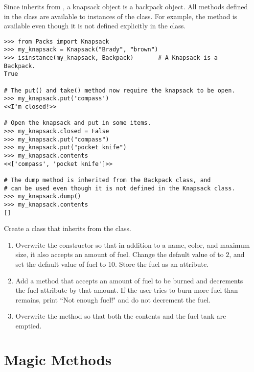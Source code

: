 Since  inherits from , a knapsack object is a backpack object.
All methods defined in the  class are available to instances of the  class.
For example, the  method is available even though it is not defined explicitly in the  class.

\begin{lstlisting}
>>> from Packs import Knapsack
>>> my_knapsack = Knapsack("Brady", "brown")
>>> isinstance(my_knapsack, Backpack)       # A Knapsack is a Backpack.
True

# The put() and take() method now require the knapsack to be open.
>>> my_knapsack.put('compass')
<<I'm closed!>>

# Open the knapsack and put in some items.
>>> my_knapsack.closed = False
>>> my_knapsack.put("compass")
>>> my_knapsack.put("pocket knife")
>>> my_knapsack.contents
<<['compass', 'pocket knife']>>

# The dump method is inherited from the Backpack class, and
# can be used even though it is not defined in the Knapsack class.
>>> my_knapsack.dump()
>>> my_knapsack.contents
[]
\end{lstlisting}

\begin{problem} %
Create a  class that inherits from the  class.
\begin{enumerate}
\item Overwrite the constructor so that in addition to a name, color, and maximum size, it also accepts an amount of fuel.
Change the default value of  to $2$, and set the default value of fuel to $10$.
Store the fuel as an attribute.

\item Add a  method that accepts an amount of fuel to be burned and decrements the fuel attribute by that amount.
If the user tries to burn more fuel than remains, print ``Not enough fuel!" and do not decrement the fuel.

\item Overwrite the  method so that both the contents and the fuel tank are emptied.
\end{enumerate}
\end{problem}

\section*{Magic Methods} %

